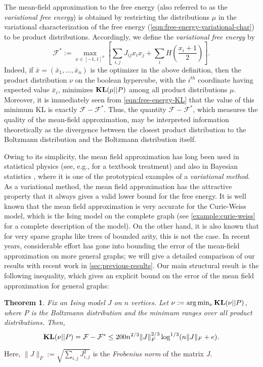 \documentclass[final, 12pt]{colt2018}
\newcommand{\F}{\mathcal{F}}
\newcommand{\KL}{\mathop{\bf KL\/}}
\newtheorem{theorem}{Theorem}[section]
\theoremstyle{definition}
\theoremstyle{plain}
\begin{document}
The mean-field approximation to the free energy (also referred to as the \emph{variational free energy}) is obtained by restricting the distributions $\mu$ in the variational characterization of the free energy (\cref{eqn:free-energy-variational-char}) to be product distributions. Accordingly, we define the \emph{variational free energy} by 
\[ \F^* := \max_{x \in [-1,1]^n} \left[\sum_{i,j} J_{ij}
      x_i x_j + \sum_i H\left(\frac{x_i +
        1}{2}\right)\right]. \] 
Indeed, if $\bar{x} = (\bar{x}_1,\dots,\bar{x}_n)$ is the optimizer in the above definition, then the product distribution $\nu$ on the boolean hypercube, with the $i^{th}$ coordinate having expected value $\bar{x}_i$, minimizes $\KL(\mu||P)$ among all product distributions $\mu$. Moreover, it is immediately seen from \cref{eqn:free-energy-KL} that the value of this minimum KL is exactly $\F - \F^*$. Thus, the quantity $\F - \F^*$, which measures the quality of the mean-field approximation, may be interpreted information theoretically as the divergence between the closest product distribution to the Boltzmann distribution and the Boltzmann distribution itself.  
 
Owing to its simplicity, the mean field approximation %
has long been used in statistical physics (see, e.g., \citet{parisi1988statistical} for a textbook treatment) and also in Bayesian statistics \citep{peterson-anderson,jordan1999introduction,wainwright-jordan-variational}, where it is one of the prototypical examples of a \emph{variational method}. As a variational method, the mean field approximation has the attractive property that it always gives a valid lower bound for the free energy. It is well known \citep{ellis-newman} that the mean field approximation
is very accurate for the Curie-Weiss model, which is the Ising
model on the complete graph (see \cref{example:curie-weiss}
for a complete description of the model). On the other hand, it is also known \citep{DemboMontanari:10} that for very sparse graphs like trees of bounded arity, this is not the case. 
In recent years, considerable effort has gone into bounding the error of the mean-field approximation on more general
graphs; we will give a detailed comparison of our results
with recent work in \cref{sec:previous-results}. Our main structural result is the following inequality, which gives an explicit bound on the error of the mean field approximation for general graphs:

\begin{theorem}\label{thm-main-structural-result} 
Fix an Ising model $J$ on $n$ vertices.
Let $\nu := \arg\min_{\nu} \KL(\nu || P)$, where $P$ is the Boltzmann distribution and the minimum ranges
over all product distributions. %
Then,
$$ \KL(\nu || P)  = \F - \F^{*} \leq 200 n^{2/3} \|J\|_F^{2/3} \log^{1/3}(n \|J\|_F + e).$$
\end{theorem}
Here, $\|J\|_F := \sqrt{\sum_{i,j}J_{i,j}^2}$ is the \emph{Frobenius norm} of the matrix $J$. 
\end{document}
